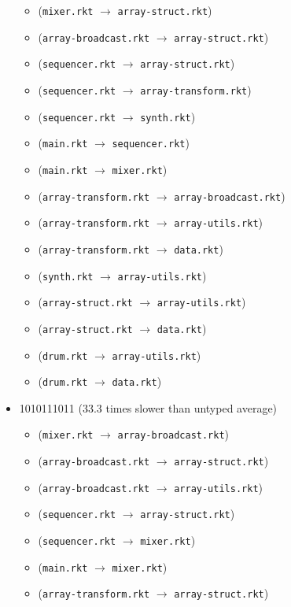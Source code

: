 \documentclass{article}
\newcommand{\mono}[1]{\texttt{#1}}
\begin{document}
\begin{itemize}
  \begin{itemize}
  \item (\mono{mixer.rkt} $\rightarrow$ \mono{array-struct.rkt})
  \item (\mono{array-broadcast.rkt} $\rightarrow$ \mono{array-struct.rkt})
  \item (\mono{sequencer.rkt} $\rightarrow$ \mono{array-struct.rkt})
  \item (\mono{sequencer.rkt} $\rightarrow$ \mono{array-transform.rkt})
  \item (\mono{sequencer.rkt} $\rightarrow$ \mono{synth.rkt})
  \item (\mono{main.rkt} $\rightarrow$ \mono{sequencer.rkt})
  \item (\mono{main.rkt} $\rightarrow$ \mono{mixer.rkt})
  \item (\mono{array-transform.rkt} $\rightarrow$ \mono{array-broadcast.rkt})
  \item (\mono{array-transform.rkt} $\rightarrow$ \mono{array-utils.rkt})
  \item (\mono{array-transform.rkt} $\rightarrow$ \mono{data.rkt})
  \item (\mono{synth.rkt} $\rightarrow$ \mono{array-utils.rkt})
  \item (\mono{array-struct.rkt} $\rightarrow$ \mono{array-utils.rkt})
  \item (\mono{array-struct.rkt} $\rightarrow$ \mono{data.rkt})
  \item (\mono{drum.rkt} $\rightarrow$ \mono{array-utils.rkt})
  \item (\mono{drum.rkt} $\rightarrow$ \mono{data.rkt})
  \end{itemize}
\item 1010111011 (33.3 times slower than untyped average)
  \begin{itemize}
  \item (\mono{mixer.rkt} $\rightarrow$ \mono{array-broadcast.rkt})
  \item (\mono{array-broadcast.rkt} $\rightarrow$ \mono{array-struct.rkt})
  \item (\mono{array-broadcast.rkt} $\rightarrow$ \mono{array-utils.rkt})
  \item (\mono{sequencer.rkt} $\rightarrow$ \mono{array-struct.rkt})
  \item (\mono{sequencer.rkt} $\rightarrow$ \mono{mixer.rkt})
  \item (\mono{main.rkt} $\rightarrow$ \mono{mixer.rkt})
  \item (\mono{array-transform.rkt} $\rightarrow$ \mono{array-struct.rkt})

\end{itemize}
\end{itemize}
\end{document}
